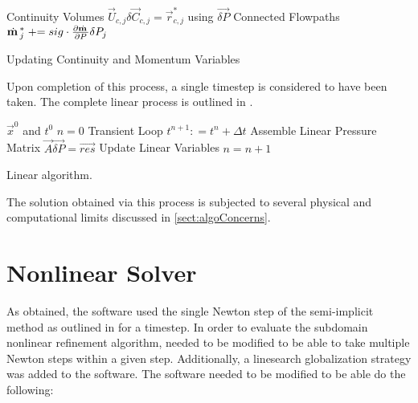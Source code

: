 \begin{algo}[H]
\setlength{\baselineskip}{0.625\baselineskip}
\begin{algorithmic}[1]
\Loop \; Continuity Volumes
	\Solve $\vec{U}_{c, j} \delta \vec{C}_{c, j} = \vec{r}^{*}_{c, j}$ using $\vec{\delta P}$		
	\Loop \; Connected Flowpaths
		\Set $\dot{\vec{m}}^{*}_{j} \pluseq sig \cdot \frac{\partial \dot{\vec{m}}}{\partial P} \delta P_{j}$
	\EndLoop
\EndLoop
\end{algorithmic}
\caption{Updating Continuity and Momentum Variables}
\label{alg:updateVariables}
\end{algo}

Upon completion of this process, a single timestep is considered to have been taken.
The complete linear process is outlined in .

\begin{algo}[H]
\setlength{\baselineskip}{0.625\baselineskip}
\begin{algorithmic}[1]
\Require $\vec{x}^{0}$ and $t^{0}$
\Set $n = 0$
\Loop \; Transient Loop
    \Set $t^{n+1} : = t^{n} + \Delta t$
	\Algorithm Assemble Linear Pressure Matrix 
   	\Solve $\vec{A} \vec{\delta P} = \vec{res}$
	\Algorithm Update Linear Variables 
	\Set $n = n + 1$
\EndLoop
\end{algorithmic}
\caption{Linear \cobra{} algorithm.}
\label{alg:linCobraAlgorithm}
\end{algo}

The solution obtained via this process is subjected to several physical and computational limits discussed in \eqref{sect:algoConcerns}.

\section{Nonlinear Solver}
\label{sect:nlnCobraSolver}
As obtained, the \cobra{} software used the single Newton step of the semi-implicit method as outlined in  for a timestep.
In order to evaluate the subdomain nonlinear refinement algorithm, \cobra{} needed to be modified to be able to take multiple Newton steps within a given step.
Additionally, a linesearch globalization strategy was added to the software.
The \cobra{} software needed to be modified to be able do the following:

